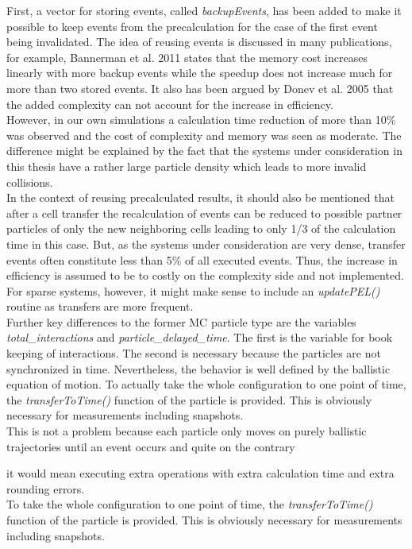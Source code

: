 First, a vector for storing events, called \textit{backupEvents}, has been added to make it possible to keep events from the precalculation for the case of the first event being invalidated. The idea of reusing events is discussed in many publications, for example, Bannerman et al. 2011\cite{Bannerman2011} states that the memory cost increases linearly with more backup events while the speedup does not increase much for more than two stored events. It also has been argued by Donev et al. 2005\cite{DONEV2005} that the added complexity can not account for the increase in efficiency.\\ 
However, in our own simulations a calculation time reduction of more than 10\% was observed and the cost of complexity and memory was seen as moderate. The difference might be explained by the fact that the systems under consideration in this thesis have a rather large particle density which leads to more invalid collisions.\\

In the context of reusing precalculated results, it should also be mentioned that after a cell transfer the recalculation of events can be reduced to possible partner particles of only the new neighboring cells leading to only 1/3 of the calculation time in this case. But, as the systems under consideration are very dense, transfer events often constitute less than 5\% of all executed events. Thus, the increase in efficiency is assumed to be to costly on the complexity side and not implemented. For sparse systems, however, it might make sense to include an \textit{updatePEL()} routine as transfers are more frequent.\\

Further key differences to the former MC particle type are the variables \textit{total\_interactions} and \textit{particle\_delayed\_time}. The first is the variable for book keeping of interactions. The second is necessary because the particles are not synchronized in time. Nevertheless, the behavior is well defined by the ballistic equation of motion. To actually take the whole configuration to one point of time, the \textit{transferToTime()} function of the particle is provided. This is obviously necessary for measurements including snapshots.\\

This is not a problem because each particle only moves on purely ballistic trajectories until an event occurs and quite on the contrary 

it would mean executing extra operations with extra calculation time and extra rounding errors.\\
To take the whole configuration to one point of time, the \textit{transferToTime()} function of the particle is provided. This is obviously necessary for measurements including snapshots.\\

